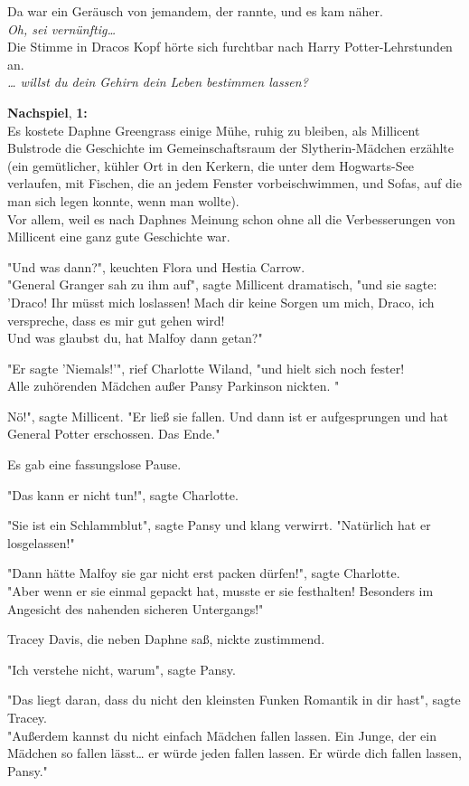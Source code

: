 {Da war ein Geräusch von jemandem, der rannte, und es kam näher.\\ \emph{\hfill\break Oh, sei vernünftig…}\\ Die Stimme in Dracos Kopf hörte sich furchtbar nach Harry Potter-Lehrstunden an.\\ \emph{… willst du dein Gehirn dein Leben bestimmen lassen?}

\textbf{Nachspiel}, \textbf{1:}\\ Es kostete Daphne Greengrass einige Mühe, ruhig zu bleiben, als Millicent Bulstrode die Geschichte im Gemeinschaftsraum der Slytherin-Mädchen erzählte (ein gemütlicher, kühler Ort in den Kerkern, die unter dem Hogwarts-See verlaufen, mit Fischen, die an jedem Fenster vorbeischwimmen, und Sofas, auf die man sich legen konnte, wenn man wollte).\\ Vor allem, weil es nach Daphnes Meinung schon ohne all die Verbesserungen von Millicent eine ganz gute Geschichte war.

"Und was dann?", keuchten Flora und Hestia Carrow.\\ "General Granger sah zu ihm auf", sagte Millicent dramatisch, "und sie sagte: 'Draco! Ihr müsst mich loslassen! Mach dir keine Sorgen um mich, Draco, ich verspreche, dass es mir gut gehen wird!\\ Und was glaubst du, hat Malfoy dann getan?"

"Er sagte 'Niemals!'", rief Charlotte Wiland, "und hielt sich noch fester!\\ Alle zuhörenden Mädchen außer Pansy Parkinson nickten. "

Nö!", sagte Millicent. "Er ließ sie fallen. Und dann ist er aufgesprungen und hat General Potter erschossen. Das Ende."

Es gab eine fassungslose Pause.

"Das kann er nicht tun!", sagte Charlotte.

"Sie ist ein Schlammblut", sagte Pansy und klang verwirrt. "Natürlich hat er losgelassen!"

"Dann hätte Malfoy sie gar nicht erst packen dürfen!", sagte Charlotte.\\ "Aber wenn er sie einmal gepackt hat, musste er sie festhalten! Besonders im Angesicht des nahenden sicheren Untergangs!"

Tracey Davis, die neben Daphne saß, nickte zustimmend.

"Ich verstehe nicht, warum", sagte Pansy.

"Das liegt daran, dass du nicht den kleinsten Funken Romantik in dir hast", sagte Tracey.\\ "Außerdem kannst du nicht einfach Mädchen fallen lassen. Ein Junge, der ein Mädchen so fallen lässt… er würde jeden fallen lassen. Er würde dich fallen lassen, Pansy."

}
